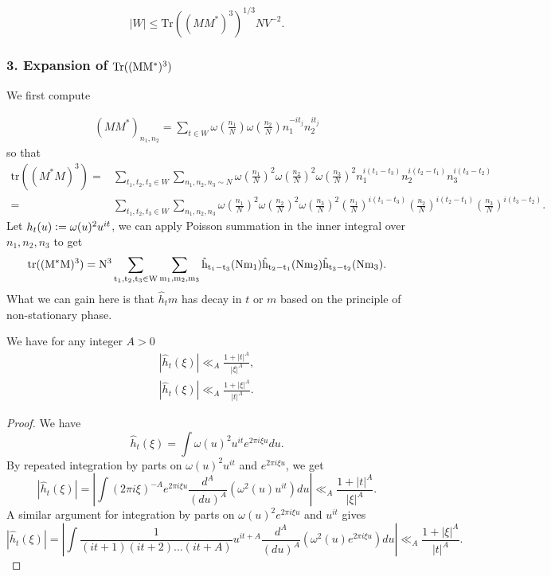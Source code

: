\begin{equation}
    \label{traceineq}
    |W|\leq \textrm{Tr}((MM^*)^3)^{1/3} NV^{-2}.
\end{equation}

\subsubsection*{3. Expansion of $\rm{Tr}((MM^*)^3)$}
We first compute 

\begin{align*}
    (MM^*)_{n_1,n_2} = \sum_{t\in W} \omega\left(\frac{n_1}{N}\right)\omega\left(\frac{n_2}{N}\right)
    n_1^{-it_j}n_2^{it_j}
\end{align*}
so that\begin{align*}
    \textrm{tr}((M^*M)^3)=& \sum_{t_1,t_2,t_3\in W}\sum_{n_1,n_2,n_3\sim N} 
    \omega\left(\frac{n_1}{N}\right)^2\omega\left(\frac{n_2}{N}\right)^2\omega\left(\frac{n_3}{N}\right)^2 n_1^{i(t_1-t_3)}
   n_2^{i(t_2-t_1)}
    n_3^{i(t_3-t_2)}\\=& \sum_{t_1,t_2,t_3\in W}\sum_{n_1,n_2,n_3} 
    \omega\left(\frac{n_1}{N}\right)^2\omega\left(\frac{n_2}{N}\right)^2\omega\left(\frac{n_3}{N}\right)^2 \left(\frac{n_1}{N}\right)^{i(t_1-t_3)}
    \left(\frac{n_2}{N}\right)^{i(t_2-t_1)}
    \left(\frac{n_3}{N}\right)^{i(t_3-t_2)}.
\end{align*}
Let $h_t(u)\mathrel{\mathop:}= \omega(u)^2 u^{it}$, we can apply Poisson summation in the inner integral over $n_1,n_2,n_3$ to get 
\begin{equation}\label{poissongm}
    \rm{tr}((M^*M)^3)= N^3\sum_{t_1,t_2,t_3\in W}\sum_{m_1,m_2,m_3}  \hat{h}_{t_1-t_3}(Nm_1)\hat{h}_{t_2-t_1}(Nm_2)\hat{h}_{t_3-t_2}(Nm_3).
\end{equation}
What we can gain here is that $\hat{h}_t{m}$ has decay in $t$ or $m$ based on the principle of non-stationary phase. 
\begin{lemma}
    \label{nonstationary}
    We have for any integer $A>0$\begin{align*}
        |\hat{h}_t(\xi)|\ll_A \frac{1+|t|^A}{|\xi|^A},\\
        |\hat{h}_t(\xi)|\ll_A \frac{1+|\xi|^A}{|t|^A}. 
    \end{align*}
\end{lemma}
\begin{proof}
   We have \[
   \hat{h}_t(\xi)=\int \omega(u)^2u^{it}e^{2\pi i \xi u} du.\]
   By repeated integration by parts on $\omega(u)^2u^{it}$ and $e^{2\pi i \xi u}$, we get \[
    |\hat{h}_t(\xi)|=\left|\int (2\pi i \xi)^{-A} e^{2\pi i \xi u}  \frac{d^A}{(du)^A}\left(\omega^2(u)u^{it}\right) du\right| \ll_A \frac{1+|t|^A}{|\xi|^A}.
   \]
   A similar argument for integration by parts on $\omega(u)^2e^{2\pi i \xi u}$ and $u^{it}$ gives \[
    |\hat{h}_t(\xi)|=\left|\int \frac{1}{(it+1)(it+2)\ldots(it+A)}u^{it+A}  \frac{d^A}{(du)^A}\left(\omega^2(u)e^{2\pi i \xi u}\right) du \right|\ll_A \frac{1+|\xi|^A}{|t|^A}.
   \]
\end{proof}
